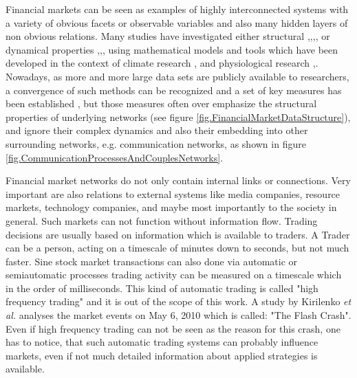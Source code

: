\documentclass[a4paper,10pt]{scrbook}
\begin{document}
Financial markets can be seen as examples of highly interconnected systems with a variety of obvious facets or observable variables 
and also many hidden layers of non obvious relations. Many studies have investigated either structural \cite{a1},\cite{a2},\cite{a3},\cite{a4}, 
or  dynamical properties \cite{b1},\cite{b2},\cite{b3},\cite{b4} 
using mathematical models and tools which have been developed in the context of climate research \cite{c1},\cite{c2} and physiological research \cite{d1},\cite{d2}. Nowadays, as more and more large data sets are publicly available to researchers, a convergence of such 
methods can be recognized and a set of key measures has been established \cite{BOOK.NEWMAN},
but those measures often over emphasize the structural properties of underlying networks (see figure \ref{fig.FinancialMarketDataStructure}), and ignore their complex dynamics and also their embedding into other surrounding networks, e.g. communication networks, as shown in figure \ref{fig.CommunicationProcessesAndCouplesNetworks}.

\label{ext.fig.FinancialMarketDataStructure} 


Financial market networks do not only contain internal links or connections. Very important are also relations to external systems
like media companies, resource markets, technology companies, and maybe most importantly to the society in general. 
Such markets can not function without information flow. Trading decisions are usually based on information which is available to traders. A Trader can be a person, acting on a timescale of minutes down to seconds, but not much faster. Sine stock market transactions can also done via automatic or semiautomatic processes trading activity can be measured on a timescale which in the order of milliseconds. This kind of automatic trading is called "high frequency trading" and it is out of the scope of this work. A study by Kirilenko \textit{et al.} \cite{Kirilenko2011} analyses the market events on May 6, 2010 which is called: "The Flash Crash". Even if high frequency trading can not be seen as the reason for this crash, one has to notice, that such automatic trading systems can probably influence markets, even if not much detailed information about applied strategies is available. 
\end{document}
